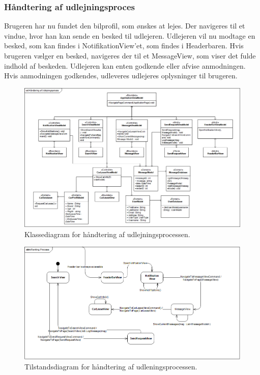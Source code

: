 \documentclass[Rapport/Rapport_main.tex]{subfiles}
\begin{document}
\subsubsection{Håndtering af udlejningsproces}
Brugeren har nu fundet den bilprofil, som ønskes at lejes. Der navigeres til et vindue, hvor han kan sende en besked til udlejeren. Udlejeren vil nu modtage en besked, som kan findes i NotifikationView'et, som findes i Headerbaren. Hvis brugeren vælger en besked, navigeres der til et MessageView, som viser det fulde indhold af beskeden. Udlejeren kan enten godkende eller afvise anmodningen. Hvis anmodningen godkendes, udleveres udlejeres oplysninger til brugeren. 
\begin{figure}[H]
    \centering
    \includegraphics[width=1\textwidth]{Arkitektur/Softwarearkitektur/Leasing/graphics/Leasing_processCD.png}
    \caption{Klassediagram for håndtering af udlejningsprocessen.}
    \label{fig:Leasing_processCD}
\end{figure}

\begin{figure}[H]
    \centering
    \includegraphics[width=1\textwidth]{Arkitektur/Softwarearkitektur/Leasing/graphics/Leasing_processSTM.png}
    \caption{Tilstandsdiagram for håndtering af udleningsprocessen. }
    \label{fig:Leasing_processSTM}
\end{figure}
\end{document}
